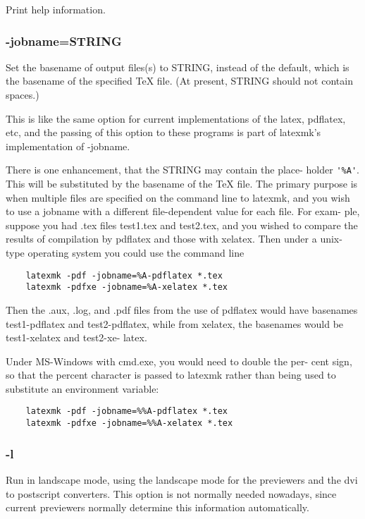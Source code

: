 Print help information.

\subsubsection{-jobname=STRING}

Set  the  basename  of output files(s) to STRING, instead of the
default, which is the basename of the specified TeX  file.   (At
present, STRING should not contain spaces.)

This  is like the same option for current implementations of the
latex, pdflatex, etc, and the passing of this  option  to  these
programs is part of latexmk's implementation of -jobname.

There is one enhancement, that the STRING may contain the place- holder
\verb|'%A'|. This will be substituted by the basename of the TeX file.   The
primary purpose is when multiple files are specified on the command line to
latexmk, and you wish to  use  a  jobname with  a different file-dependent
value for each file.  For exam- ple, suppose you had .tex files test1.tex and
test2.tex, and you wished  to  compare  the  results of compilation by pdflatex
and those with xelatex.  Then under a unix-type operating system you could use
the command line

\begin{verbatim}
	latexmk -pdf -jobname=%A-pdflatex *.tex
	latexmk -pdfxe -jobname=%A-xelatex *.tex
\end{verbatim}

Then  the  .aux,  .log,  and .pdf files from the use of pdflatex
would have basenames test1-pdflatex  and  test2-pdflatex,  while
from xelatex, the basenames would be test1-xelatex and test2-xe-
latex.

Under MS-Windows with cmd.exe, you would need to double the per-
cent  sign,  so  that the percent character is passed to latexmk
rather than being used to substitute an environment variable:

\begin{verbatim}
	latexmk -pdf -jobname=%%A-pdflatex *.tex
	latexmk -pdfxe -jobname=%%A-xelatex *.tex
\end{verbatim}


\subsubsection{-l}

Run in landscape mode, using the landscape mode for the previewers  and  the
dvi to postscript converters.  This option is not normally needed nowadays,
since current previewers normally  determine this information automatically.

